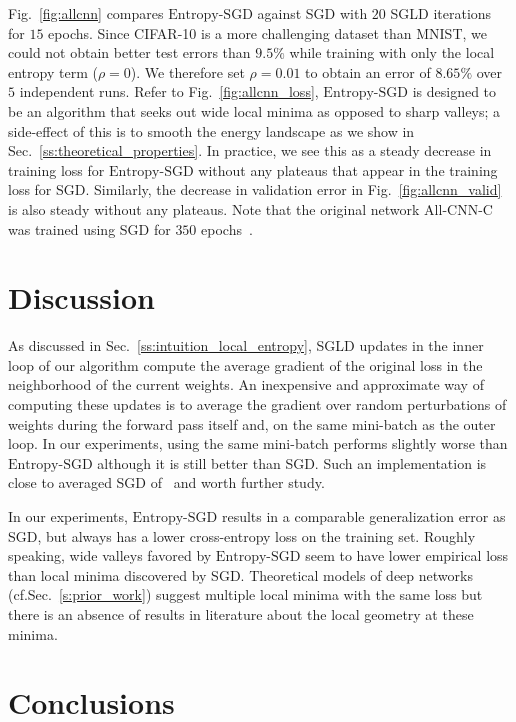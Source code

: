 \documentclass[10pt]{article}
\newcommand{\entropysgd}{\mathrm{Entropy}\textrm{-}\mathrm{SGD}}
\begin{document}
Fig.~\ref{fig:allcnn} compares $\entropysgd$ against SGD with $20$ SGLD iterations for $15$ epochs. Since CIFAR-10 is a more challenging dataset than MNIST, we could not obtain better test errors than $9.5\%$ while training with only the local entropy term ($\rho = 0$). We therefore set $\rho = 0.01$ to obtain an error of $8.65\%$ over $5$ independent runs. Refer to Fig.~\ref{fig:allcnn_loss}, $\entropysgd$ is designed to be an algorithm that seeks out wide local minima as opposed to sharp valleys; a side-effect of this is to smooth the energy landscape as we show in Sec.~\ref{ss:theoretical_properties}. In practice, we see this as a steady decrease in training loss for $\entropysgd$ without any plateaus that appear in the training loss for SGD. Similarly, the decrease in validation error in Fig.~\ref{fig:allcnn_valid} is also steady without any plateaus. Note that the original network $\textrm{All-CNN-C}$ was trained using SGD for $350$ epochs~\citep{springenberg2014striving}.

\section{Discussion}
\label{s:discussion}

As discussed in Sec.~\ref{ss:intuition_local_entropy}, SGLD updates in the inner loop of our algorithm compute the average gradient of the original loss in the neighborhood of the current weights. An inexpensive and approximate way of computing these updates is to average the gradient over random perturbations of weights during the forward pass itself and, on the same mini-batch as the outer loop. In our experiments, using the same mini-batch performs slightly worse than $\entropysgd$ although it is still better than SGD. Such an implementation is close to averaged SGD of~\citep{polyak1992acceleration,bottou2012stochastic} and worth further study.

In our experiments, $\entropysgd$ results in a comparable generalization error as SGD, but always has a lower cross-entropy loss on the training set. Roughly speaking, wide valleys favored by $\entropysgd$ seem to have lower empirical loss than local minima discovered by SGD. Theoretical models of deep networks (cf.\@ Sec.~\ref{s:prior_work}) suggest multiple local minima with the same loss but there is an absence of results in literature about the local geometry at these minima.

\section{Conclusions}
\label{s:conclusions}
\end{document}
